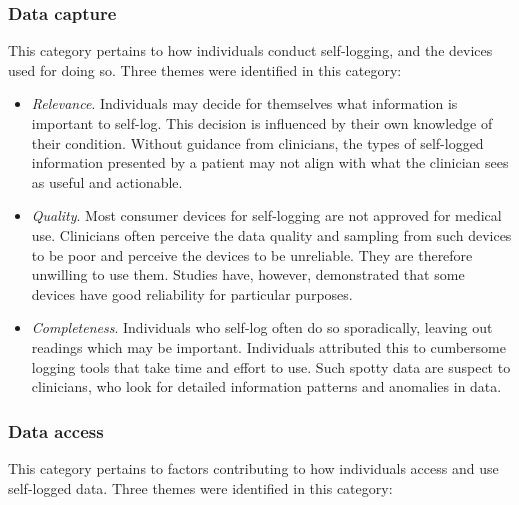 \documentclass{sigchi}
\begin{document}
\subsubsection{Data capture}

This category pertains to how individuals conduct self-logging, and the devices used for doing so. Three themes were identified in this category:

\begin{itemize}
    \item \textit{Relevance}. Individuals may decide for themselves what information is important to self-log. This decision is influenced by their own knowledge of their condition. Without guidance from clinicians, the types of self-logged information presented by a patient may not align with what the clinician sees as useful and actionable.
    
    \item \textit{Quality}. Most consumer devices for self-logging are not approved for medical use. Clinicians often perceive the data quality and sampling from such devices to be poor and perceive the devices to be unreliable. They are therefore unwilling to use them. Studies have, however, demonstrated that some devices have good reliability for particular purposes.
    
    \item \textit{Completeness}. Individuals who self-log often do so sporadically, leaving out readings which may be important. Individuals attributed this to cumbersome logging tools that take time and effort to use. Such spotty data are suspect to clinicians, who look for detailed information patterns and anomalies in data.
\end{itemize}

\subsubsection{Data access}

This category pertains to factors contributing to how individuals access and use self-logged data. Three themes were identified in this category:
\end{document}

